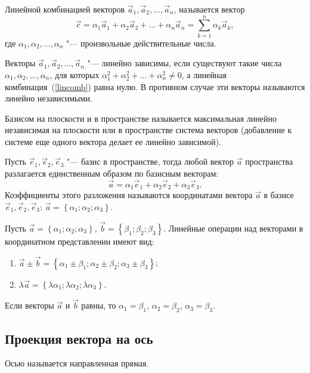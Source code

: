 \documentclass[10pt]{article}
\numberwithin{primer}{section}
\numberwithin{equation}{section}
\begin{document}
Линейной комбинацией векторов  $\vec{a}_1,\vec{a}_2,\ldots,\vec{a}_n$, называется вектор
\begin{equation}\label{lincomb}
\vec{c}=\alpha_1\vec{a}_1+\alpha_2\vec{a}_2+\ldots+\alpha_n\vec{a}_n=\sum_{k=1}^n\alpha_k\vec{a}_k,
\end{equation}
где $\alpha_1,\alpha_2,\ldots,\alpha_n$ "--- произвольные действительные числа.

Векторы $\vec{a}_1,\vec{a}_2,\ldots,\vec{a}_n$ "--- линейно зависимы, если  существуют такие числа  $\alpha_1,\alpha_2,\ldots,\alpha_n$, для которых $\alpha_1^2+\alpha_2^2+\ldots+\alpha_n^2\neq 0$, а линейная комбинация~(\ref{lincomb}) равна нулю. В противном случае эти векторы называются линейно независимыми.

Базисом на плоскости и в пространстве называется максимальная линейно независимая на плоскости или в пространстве система векторов (добавление к системе еще одного вектора делает ее линейно зависимой).

Пусть   $\vec{e}_1,\vec{e}_2,\vec{e}_3$ "--- базис в пространстве, тогда любой вектор $\vec{a}$  пространства разлагается единственным образом по базисным векторам:
\[
\vec{a}=\alpha_1\vec{e}_1+\alpha_2\vec{e}_2+\alpha_3\vec{e}_3.
\]
Коэффициенты этого разложения называются координатами вектора $\vec{a}$  в базисе  $\vec{e}_1,\vec{e}_2,\vec{e}_3$:
$\vec{a}=\left\{\alpha_1;\alpha_2;\alpha_3\right\}$.

Пусть $\vec{a}=\left\{\alpha_1;\alpha_2;\alpha_3\right\}$, $\vec{b}=\left\{\beta_1;\beta_2;\beta_3\right\}$. Линейные операции над векторами в координатном представлении имеют вид:
\begin{enumerate}
	\item $\vec{a}\pm\vec{b}=\left\{\alpha_1\pm\beta_1;\alpha_2\pm\beta_2;\alpha_3\pm\beta_3\right\}$;
	\item $\lambda\vec{a}=\left\{\lambda\alpha_1;\lambda\alpha_2;\lambda\alpha_3\right\}$.
\end{enumerate}
Если векторы $\vec{a}$ и $\vec{b}$ равны, то $\alpha_1=\beta_1$, $\alpha_2=\beta_2$, $\alpha_3=\beta_3$.

\subsection{Проекция вектора на ось}
Осью называется направленная прямая.
\end{document}
